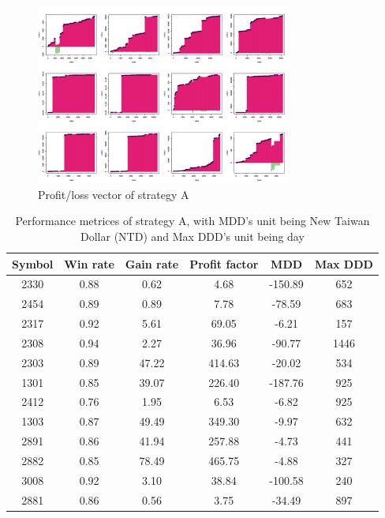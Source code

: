 \documentclass[12pt, letterpaper, oneside]{article}
\begin{document}
\begin{figure}[h]
    \centering
    \includegraphics[width=0.75\textwidth]{sa_pl}
    \caption{Profit/loss vector of strategy A}
    \label{fig:a}
\end{figure}

\begin{table}[h!]
    \centering
    \begin{tabular}{ |c|c|c|c|c|c| }
        \hline
        Symbol & Win rate & Gain rate & Profit factor & MDD & Max DDD \\ [0.5ex]
        \hline
        2330 & 0.88 & 0.62 & 4.68 & -150.89 & 652 \\
        2454 & 0.89 & 0.89 & 7.78 & -78.59 & 683 \\
        2317 & 0.92 & 5.61 & 69.05 & -6.21 & 157 \\
        2308 & 0.94 & 2.27 & 36.96 & -90.77 & 1446 \\
        2303 & 0.89 & 47.22 & 414.63 & -20.02 & 534 \\
        1301 & 0.85 & 39.07 & 226.40 & -187.76 & 925 \\
        2412 & 0.76 & 1.95 & 6.53 & -6.82 & 925 \\
        1303 & 0.87 & 49.49 & 349.30 & -9.97 & 632 \\
        2891 & 0.86 & 41.94 & 257.88 & -4.73 & 441 \\
        2882 & 0.85 & 78.49 & 465.75 & -4.88 & 327 \\
        3008 & 0.92 & 3.10 & 38.84 & -100.58 & 240 \\
        2881 & 0.86 & 0.56 & 3.75 & -34.49 & 897 \\ [0.5ex]
        \hline
    \end{tabular}
    \caption{Performance metrices of strategy A, with MDD's unit being New Taiwan Dollar (NTD) and Max DDD's unit being day}
    \label{table:a}
\end{table}
\end{document}
